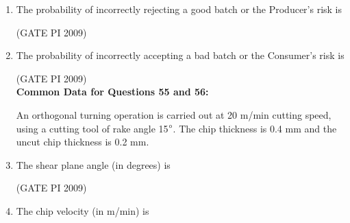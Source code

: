 \documentclass[journal,12pt,onecolumn]{IEEEtran}
\theoremstyle{remark}
\begin{document}
\begin{enumerate}
\item The probability of incorrectly rejecting a good batch or the Producer's risk is
\begin{enumerate}
\end{enumerate}
\hfill (GATE PI 2009)
\item The probability of incorrectly accepting a bad batch or the Consumer's risk is
\begin{enumerate}
\end{enumerate}
\hfill (GATE PI 2009) \\
\textbf{Common Data for Questions 55 and 56:}

An orthogonal turning operation is carried out at 20 m/min cutting speed, using a cutting tool of rake angle 15$\degree$. The chip thickness is 0.4 mm and the uncut chip thickness is 0.2 mm.


\item The shear plane angle (in degrees) is
\begin{enumerate}
\end{enumerate}
\hfill (GATE PI 2009)
\item The chip velocity (in m/min) is
\begin{enumerate}
\end{enumerate}
\end{enumerate}
\end{document}
